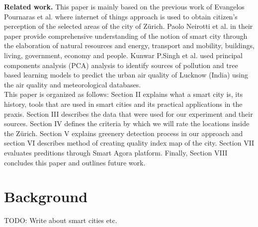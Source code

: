 \documentclass[letterpaper]{article}
\newcommand{\mypar}[1]{{\bf #1.}}
\begin{document}
\mypar{Related work} This paper is mainly based on the previous work of Evangelos Pournaras et al. \cite{smartCities}
where internet of things approach is used to obtain citizen's perception of the selected areas of the city of Zürich.
Paolo Neirotti et al. \cite{smartCities2} in their paper provide comprehensive understanding of the notion of smart city
through the elaboration of natural resources and energy, transport and mobility, buildings, living, government, economy
and people. Kunwar P.Singh et al. \cite{pollution} used principal components analysis (PCA) analysis to identify sources
of pollution and tree based learning models to predict the urban air quality of Lucknow (India) using the air quality
and meteorological databases.
\\
\indent This paper is organized as follows: Section II explains what a smart city is, its history, tools that are used
in smart cities and its practical applications in the praxis. Section III describes the data that were used for our
experiment and their sources. Section IV defines the criteria by which we will rate the locations inside the Zürich.
Section V explains greenery detection process in our approach and section VI describes method of creating quality index
map of the city. Section VII evaluates preditions through Smart Agora platform. Finally, Section VIII concludes this
paper and outlines future work.

\section{Background}\label{sec:background}
TODO: Write about smart cities etc.
\end{document}
